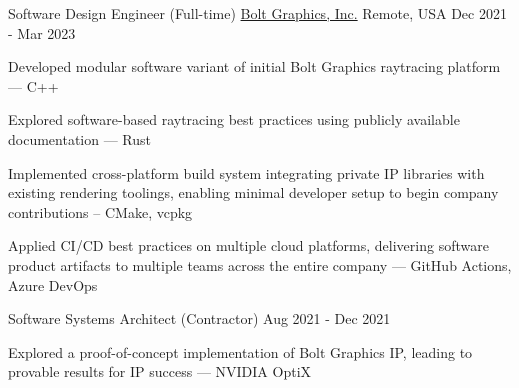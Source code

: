 

\begin{cventries}
  \cventry
    {Software Design Engineer (Full-time)} %
    {\href{https://www.bolt.graphics/}{Bolt Graphics, Inc.}} %
    {Remote, USA} %
    {Dec 2021 - Mar 2023} %
    {
      \begin{cvitems} %
        \item Developed modular software variant of initial Bolt Graphics raytracing platform --- C++
        \item Explored software-based raytracing best practices using publicly available documentation --- Rust
        \item Implemented cross-platform build system integrating private IP libraries with existing rendering toolings, enabling minimal developer setup to begin company contributions -- CMake, vcpkg
        \item Applied CI/CD best practices on multiple cloud platforms, delivering software product artifacts to multiple teams across the entire company --- GitHub Actions, Azure DevOps
      \end{cvitems}
    }

  \cventry
    {Software Systems Architect (Contractor)} %
    {} %
    {} %
    {Aug 2021 - Dec 2021} %
    {
      \begin{cvitems} %
        \item Explored a proof-of-concept implementation of Bolt Graphics IP, leading to provable results for IP success --- NVIDIA OptiX
      \end{cvitems}
    }


\end{cventries}
